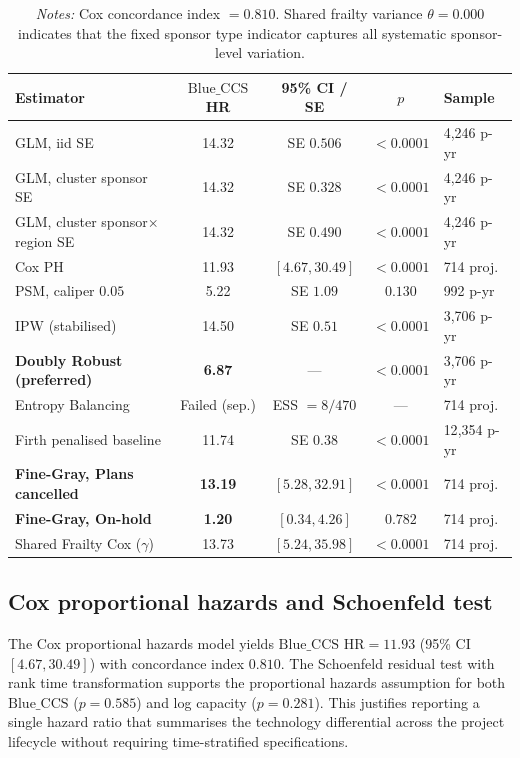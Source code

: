 \documentclass[11pt,a4paper]{article}
\newcommand{\HR}{\mathrm{HR}}
\newcommand{\BlueCCS}{\mathrm{Blue\_CCS}}
\begin{document}
\begin{table}[H]
\centering
\caption{$\BlueCCS$ hazard ratio across eleven estimators.}
\label{tab:headline}
\small
\begin{tabular}{lcccl}
\toprule
\textbf{Estimator} & \textbf{$\BlueCCS$ HR} & \textbf{95\% CI / SE} & \textbf{$p$} & \textbf{Sample} \\
\midrule
GLM, iid SE & 14.32 & SE $0.506$ & $<0.0001$ & 4{,}246 p-yr \\
GLM, cluster sponsor SE & 14.32 & SE $0.328$ & $<0.0001$ & 4{,}246 p-yr \\
GLM, cluster sponsor$\times$region SE & 14.32 & SE $0.490$ & $<0.0001$ & 4{,}246 p-yr \\
Cox PH & 11.93 & $[4.67, 30.49]$ & $<0.0001$ & 714 proj. \\
PSM, caliper $0.05$ & 5.22 & SE $1.09$ & $0.130$ & 992 p-yr \\
IPW (stabilised) & 14.50 & SE $0.51$ & $<0.0001$ & 3{,}706 p-yr \\
\textbf{Doubly Robust (preferred)} & \textbf{6.87} & --- & $<0.0001$ & 3{,}706 p-yr \\
Entropy Balancing & Failed (sep.) & ESS $= 8/470$ & --- & 714 proj. \\
Firth penalised baseline & 11.74 & SE $0.38$ & $<0.0001$ & 12{,}354 p-yr \\
\textbf{Fine-Gray, Plans cancelled} & \textbf{13.19} & $[5.28, 32.91]$ & $<0.0001$ & 714 proj. \\
\textbf{Fine-Gray, On-hold} & \textbf{1.20} & $[0.34, 4.26]$ & $0.782$ & 714 proj. \\
Shared Frailty Cox ($\gamma$) & 13.73 & $[5.24, 35.98]$ & $<0.0001$ & 714 proj. \\
\bottomrule
\end{tabular}
\caption*{\footnotesize \textit{Notes:} Cox concordance index $= 0.810$. Shared frailty variance $\theta = 0.000$ indicates that the fixed sponsor type indicator captures all systematic sponsor-level variation.}
\end{table}

\subsection{Cox proportional hazards and Schoenfeld test}

The Cox proportional hazards model yields $\BlueCCS$ $\HR = 11.93$ (95\% CI $[4.67, 30.49]$) with concordance index $0.810$. The Schoenfeld residual test with rank time transformation supports the proportional hazards assumption for both $\BlueCCS$ ($p = 0.585$) and log capacity ($p = 0.281$). This justifies reporting a single hazard ratio that summarises the technology differential across the project lifecycle without requiring time-stratified specifications.
\end{document}
